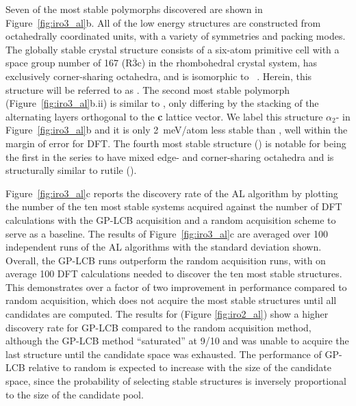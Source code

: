 %
Seven of the most stable \IrOthree polymorphs discovered are shown in Figure~\ref{fig:iro3_al}b.
%
All of the low energy \IrOthree structures are constructed from octahedrally coordinated units, with a variety of symmetries and packing modes.
%
The globally stable crystal structure consists of a six-atom primitive cell with a space group number of \num{167} (R$\overline{3}$c) in the rhombohedral crystal system, has exclusively corner-sharing octahedra, and is isomorphic to ~\cite{Hepworth1957}.
%
Herein, this structure will be referred to as \aIrOthree.
%
The second most stable polymorph (Figure~\ref{fig:iro3_al}b.ii) is similar to \aIrOthree,
only differing by the stacking of the alternating layers orthogonal to the \textbf{c} lattice vector.
%
We label this structure $\alpha_{2}$- in Figure~\ref{fig:iro3_al}b and it is only \SI{2}{\milli\electronvolt}/atom less stable than \aIrOthree,
well within the margin of error for DFT.
%
The fourth most stable structure (\rIrOthree) is notable for being the first in the series to have mixed edge- and corner-sharing octahedra and is structurally similar to rutile (\rIrOtwo).


%
%
Figure~\ref{fig:iro3_al}c reports the discovery rate of the AL algorithm by plotting
the number of the ten most stable systems acquired against the number of DFT calculations with the GP-LCB acquisition and a random acquisition scheme to serve as a baseline.
%
The results of Figure~\ref{fig:iro3_al}c are averaged over \num{100} independent runs of the AL algorithms with the standard deviation shown.
%
Overall, the GP-LCB runs outperform the random acquisition runs, with on average \mytilde\num{100} DFT calculations needed to discover the ten most stable structures.
%
This demonstrates over a factor of two improvement in performance compared to random acquisition,
which does not acquire the most stable structures until all  candidates are computed.
%
The results for \IrOtwo (Figure \ref{fig:iro2_al}) show a higher discovery rate for GP-LCB compared to the random acquisition method,
although the GP-LCB method ``saturated'' at \num{9/10} and was unable to acquire the last structure until the candidate space was exhausted.
%
The performance of GP-LCB relative to random is expected to increase with the size of the candidate space, since the probability of selecting stable structures is inversely proportional to the size of the candidate pool.


